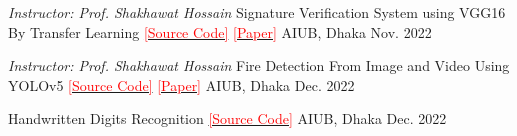 
\begin{cventries}

  \cventry
    {\textit{Instructor: Prof. Shakhawat Hossain}} %
    {Signature Verification System using VGG16 By Transfer Learning  \href{https://github.com/KaziTanvir/signature-verification-using-VGG-19.git}{\hspace{0.2em} \textcolor{red}{ \fontsize{7}{7} \textnormal {[Source Code]}}} \href{https://doi.org/10.48550/arXiv.2310.06351}{\hspace{0.5em} \textcolor{red}{ \fontsize{7}{7} \textnormal {[Paper]}}}} %
    {AIUB, Dhaka} %
    {Nov. 2022} %
    {}\vspace{-\baselineskip}

 \cventry
    {\textit{Instructor: Prof. Shakhawat Hossain}} %
    {Fire Detection From Image and Video Using YOLOv5 \href{https://github.com/aarafat27/Fire-Detection-Using-YOLOv5}{\hspace{0.2em} \textcolor{red}{ \fontsize{7}{7} \textnormal {[Source Code]}}} \href{https://doi.org/10.48550/arXiv.2310.06351}{\hspace{0.5em} \textcolor{red}{ \fontsize{7}{7} \textnormal{[Paper]}}}} %
    {AIUB, Dhaka} %
    {Dec. 2022} %
    {}\vspace{-\baselineskip}

 \cventry
    {} %
    {Handwritten Digits Recognition \href{https://github.com/imtiazhabib17/Handwritten-Digits-Recognition.git}{\hspace{0.2em} \textcolor{red}{ \fontsize{7}{7} \textnormal {[Source Code]}}} }%
    {AIUB, Dhaka} %
    {Dec. 2022} %
    {\vspace{-\baselineskip}}\vspace{-\baselineskip} 
\end{cventries}
